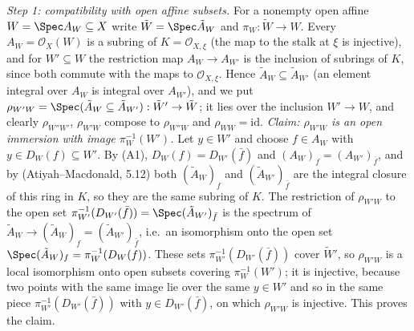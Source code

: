 \documentclass[11pt]{article}
\begin{document}
\emph{Step 1: compatibility with open affine subsets.} For a nonempty open affine $W=\Spec A_W\subseteq X$ write $\tilde W=\Spec\tilde A_W$ and $\pi_W:\tilde W\to W$. Every $A_W=\mathcal O_X(W)$ is a subring of $K=\mathcal O_{X,\xi}$ (the map to the stalk at $\xi$ is injective), and for $W'\subseteq W$ the restriction map $A_W\to A_{W'}$ is the inclusion of subrings of $K$, since both commute with the maps to $\mathcal O_{X,\xi}$. Hence $\tilde A_W\subseteq\tilde A_{W'}$ (an element integral over $A_W$ is integral over $A_{W'}$), and we put $\rho_{W'W}=\Spec(\tilde A_W\subseteq\tilde A_{W'}):\tilde W'\to\tilde W$; it lies over the inclusion $W'\to W$, and clearly $\rho_{W''W'}$, $\rho_{W'W}$ compose to $\rho_{W''W}$ and $\rho_{WW}=\mathrm{id}$. \emph{Claim: $\rho_{W'W}$ is an open immersion with image $\pi_W^{-1}(W')$.} Let $y\in W'$ and choose $f\in A_W$ with $y\in D_W(f)\subseteq W'$. By (A1), $D_W(f)=D_{W'}(\bar f)$ and $(A_W)_f=(A_{W'})_{\bar f}$, and by (Atiyah--Macdonald, 5.12) both $(\tilde A_W)_f$ and $(\tilde A_{W'})_{\bar f}$ are the integral closure of this ring in $K$, so they are the same subring of $K$. The restriction of $\rho_{W'W}$ to the open set $\pi_{W'}^{-1}(D_{W'}(\bar f))=\Spec(\tilde A_{W'})_{\bar f}$ is the spectrum of $\tilde A_W\to(\tilde A_W)_f=(\tilde A_{W'})_{\bar f}$, i.e.\ an isomorphism onto the open set $\Spec(\tilde A_W)_f=\pi_W^{-1}(D_W(f))$. These sets $\pi_{W'}^{-1}(D_{W'}(\bar f))$ cover $\tilde W'$, so $\rho_{W'W}$ is a local isomorphism onto open subsets covering $\pi_W^{-1}(W')$; it is injective, because two points with the same image lie over the same $y\in W'$ and so in the same piece $\pi_{W'}^{-1}(D_{W'}(\bar f))$ with $y\in D_{W'}(\bar f)$, on which $\rho_{W'W}$ is injective. This proves the claim.
\end{document}
